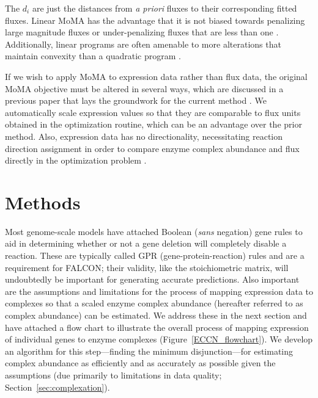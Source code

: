 The $d_i$ are just the distances from \textit{a priori} fluxes to
their corresponding fitted fluxes.  Linear MoMA has the advantage that
it is not biased towards penalizing large magnitude fluxes or
under-penalizing fluxes that are less than one
\citep{Boyd2004,Shlomi2005}. Additionally, linear programs are often
amenable to more alterations that maintain convexity than a quadratic
program \citep{Boyd2004}.

If we wish to apply MoMA to expression data rather than flux data, the
original MoMA objective must be altered in several ways, which are
discussed in a previous paper that lays the groundwork for the current
method \citep{Lee2012}. We automatically scale expression values so
that they are comparable to flux units obtained in the optimization
routine, which can be an advantage over the prior method. Also,
expression data has no directionality, necessitating reaction
direction assignment in order to compare enzyme complex abundance
and flux directly in the optimization problem \citep{Lee2012}.

\section{Methods}

Most genome-scale models have attached Boolean (\textit{sans}
negation) gene rules to aid in determining whether or not a gene
deletion will
completely disable a reaction. These are typically called GPR
(gene-protein-reaction) rules and are a requirement for FALCON; their
validity, like the stoichiometric matrix, will undoubtedly be
important for generating accurate predictions. Also important are the
assumptions and limitations for the process of mapping expression data
to complexes so that a scaled enzyme complex abundance (hereafter
referred to as complex abundance) can be estimated. We address these
in the next section and have attached a flow chart to illustrate the
overall process of mapping expression of individual genes to enzyme
complexes (Figure~\ref{ECCN_flowchart}). We develop an algorithm for
this step---finding the minimum disjunction---for estimating complex
abundance as efficiently and as accurately as possible given the
assumptions (due primarily to limitations in data quality; \suppOrApp
Section~\ref{sec:complexation}).

